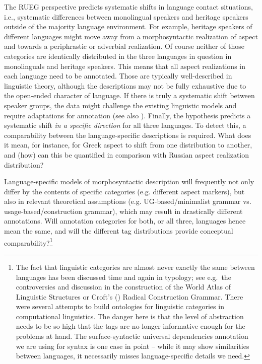 \documentclass[output=paper,colorlinks,citecolor=brown]{langscibook}
\begin{document}
The RUEG perspective predicts systematic shifts in language contact situations, i.e., systematic differences between monolingual speakers and heritage speakers outside of the majority language environment. For example, heritage speakers of different languages might move away from a morphosyntactic realization of aspect and towards a periphrastic or adverbial realization. Of course neither of those categories are identically distributed in the three languages in question in monolinguals and heritage speakers. This means that all aspect realizations in each language need to be annotated. Those are typically well\hyp described in linguistic theory, although the descriptions may not be fully exhaustive due to the open-ended character of language. If there is truly a systematic shift between speaker groups, the data might challenge the existing linguistic models and require adaptations for annotation (see also ). Finally, the hypothesis predicts a systematic shift \textit{in a specific direction} for all three languages. To detect this, a comparability between the language-specific descriptions is required. What does it mean, for instance, for Greek aspect to shift from one distribution to another, and (how) can this be quantified in comparison with Russian aspect realization distribution?

Language-specific models of morphosyntactic description will frequently not only differ by the contents of specific categories (e.g. different aspect markers), but also in relevant theoretical assumptions (e.g. UG-based/minimalist grammar vs. usage-based/construction grammar), which may result in drastically different annotations. Will annotation categories for both, or all three, languages hence mean the same, and will the different tag distributions provide conceptual comparability?\footnote{The fact that linguistic categories are almost never exactly the same between languages has been discussed time and again in typology; see e.g.~the controversies and discussion in the construction of the World Atlas of Linguistic Structures \parencite[among many others][]{CysouwAlbuDress2008} or Croft's (\citeyear{croft2001}) Radical Construction Grammar. There were several attempts to build ontologies for linguistic categories in computational linguistics. The danger here is that the level of abstraction needs to be so high that the tags are no longer informative enough for the problems at hand. The surface-syntactic universal dependencies \parencite[SUD;][]{kahane_annotation_2021} annotation we are using for syntax is one case in point -- while it may show similarities between languages, it necessarily misses language-specific details we need.}
\end{document}
